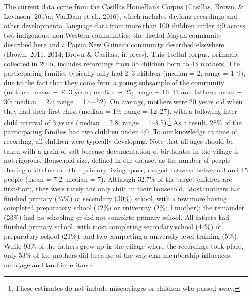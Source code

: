 \documentclass[floatsintext,man]{apa6}
\theoremstyle{definition}
\theoremstyle{definition}
\theoremstyle{definition}
\theoremstyle{remark}
\begin{document}
The current data come from the Casillas HomeBank Corpus (Casillas,
Brown, \& Levinson, 2017a; VanDam et al., 2016), which includes daylong
recordings and other developmental language data from more than 100
children under 4;0 across two indigenous, non-Western communities: the
Tseltal Mayan community described here and a Papua New Guinean community
described elsewhere (Brown, 2011, 2014; Brown \& Casillas, in press).
This Tseltal corpus, primarily collected in 2015, includes recordings
from 55 children born to 43 mothers. The participating families
typically only had 2--3 children (median = 2; range = 1--9), due to the
fact that they come from a young subsample of the community (mothers:
mean = 26.3 years; median = 25; range = 16--43 and fathers: mean = 30;
median = 27; range = 17---52). On average, mothers were 20 years old
when they had their first child (median = 19; range = 12--27), with a
following inter-child interval of 3 years (median = 2.8; range =
1--8.5).\footnote{These estimates do not include miscarriages or
  children who passed away.} As a result, 28\% of the participating
families had two children under 4;0. To our knowledge at time of
recording, all children were typically developing. Note that all ages
should be taken with a grain of salt because documentation of birthdates
in the village is not rigorous. Household size, defined in our dataset
as the number of people sharing a kitchen or other primary living space,
ranged between between 3 and 15 people (mean = 7.2; median = 7).
Although 32.7\% of the target children are first-born, they were rarely
the only child in their household. Most mothers had finished primary
(37\%) or secondary (30\%) school, with a few more having completed
preparatory school (12\%) or university (2\%; 1 mother); the remainder
(23\%) had no schooling or did not complete primary school. All fathers
had finished primary school, with most completing secondary school
(44\%) or preparatory school (21\%), and two completing a
university-level training (5\%). While 93\% of the fathers grew up in
the village where the recordings took place, only 53\% of the mothers
did because of the way clan membership influences marriage and land
inheritance.
\end{document}
